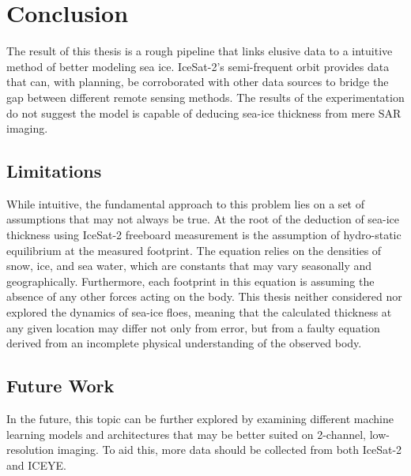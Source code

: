 \chapter{Conclusion}
\label{sec:Conclusion}

The result of this thesis is a rough pipeline that links elusive data to a intuitive method of better modeling sea ice. IceSat-2's semi-frequent orbit provides data that can, with planning, be corroborated with other data sources to bridge the gap between different remote sensing methods. The results of the experimentation do not suggest the model is capable of deducing sea-ice thickness from mere SAR imaging.

\section{Limitations}
While intuitive, the fundamental approach to this problem lies on a set of assumptions that may not always be true. At the root of the deduction of sea-ice thickness using IceSat-2 freeboard measurement is the assumption of hydro-static equilibrium at the measured footprint. The equation relies on the densities of snow, ice, and sea water, which are constants that may vary seasonally and geographically. Furthermore, each footprint in this equation is assuming the absence of any other forces acting on the body. This thesis neither considered nor explored the dynamics of sea-ice floes, meaning that the calculated thickness at any given location may differ not only from error, but from a faulty equation derived from an incomplete physical understanding of the observed body. 

\section{Future Work}
In the future, this topic can be further explored by examining different machine learning models and architectures that may be better suited on 2-channel, low-resolution imaging. To aid this, more data should be collected from both IceSat-2 and ICEYE.


